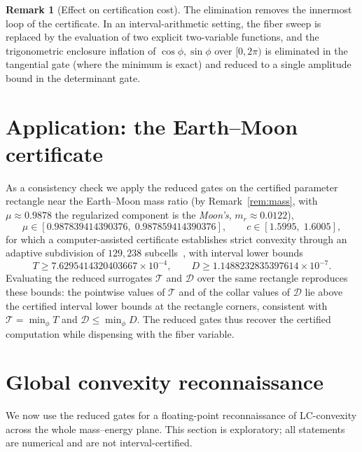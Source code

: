 \documentclass[11pt,reqno]{amsart}
\theoremstyle{plain}
\theoremstyle{definition}
\newtheorem{remark}[theorem]{Remark}
\newcommand{\calT}{\mathcal{T}}
\newcommand{\calD}{\mathcal{D}}
\begin{document}
\begin{remark}[Effect on certification cost]
The elimination removes the innermost loop of the certificate. In an interval-arithmetic setting, the fiber sweep is replaced by the evaluation of two explicit two-variable functions, and the trigonometric enclosure inflation of $\cos\phi,\sin\phi$ over $[0,2\pi)$ is eliminated in the tangential gate (where the minimum is exact) and reduced to a single amplitude bound in the determinant gate.
\end{remark}

\section{Application: the Earth--Moon certificate}\label{sec:earthmoon}

As a consistency check we apply the reduced gates on the certified parameter rectangle near the Earth--Moon mass ratio (by Remark~\ref{rem:mass}, with $\mu\approx0.9878$ the regularized component is the \emph{Moon's}, $m_r\approx 0.0122$),
\[
\mu\in[0.987839414390376,\;0.987859414390376],\qquad c\in[1.5995,\;1.6005],
\]
for which a computer-assisted certificate establishes strict convexity through an adaptive subdivision of $129{,}238$ subcells~\cite{GrisaCertificate}, with interval lower bounds
\[
T\ge 7.6295414320403667\times10^{-4},\qquad D\ge 1.1488232835397614\times10^{-7}.
\]
Evaluating the reduced surrogates $\calT$ and $\calD$ over the same rectangle reproduces these bounds: the pointwise values of $\calT$ and of the collar values of $\calD$ lie above the certified interval lower bounds at the rectangle corners, consistent with $\calT=\min_\phi T$ and $\calD\le\min_\phi D$. The reduced gates thus recover the certified computation while dispensing with the fiber variable.

\section{Global convexity reconnaissance}\label{sec:map}

We now use the reduced gates for a floating-point reconnaissance of LC-convexity across the whole mass--energy plane. This section is exploratory; all statements are numerical and are not interval-certified.
\end{document}
